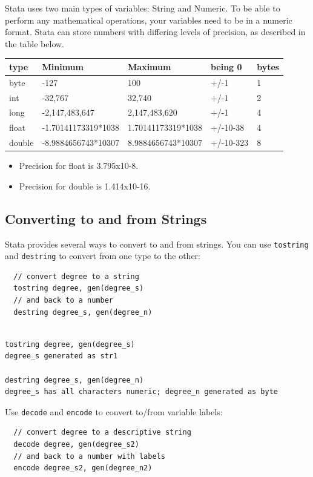 \documentclass[]{book}
\providecommand{\tightlist}{%
  \setlength{\itemsep}{0pt}\setlength{\parskip}{0pt}}
\begin{document}
Stata uses two main types of variables: String and Numeric. To be able
to perform any mathematical operations, your variables need to be in a
numeric format. Stata can store numbers with differing levels of
precision, as described in the table below.

\begin{longtable}[]{@{}lllll@{}}
\toprule
type & Minimum & Maximum & being 0 & bytes\tabularnewline
\midrule
\endhead
byte & -127 & 100 & +/-1 & 1\tabularnewline
int & -32,767 & 32,740 & +/-1 & 2\tabularnewline
long & -2,147,483,647 & 2,147,483,620 & +/-1 & 4\tabularnewline
float & -1.70141173319*1038 & 1.70141173319*1038 & +/-10-38 &
4\tabularnewline
double & -8.9884656743*10307 & 8.9884656743*10307 & +/-10-323 &
8\tabularnewline
\bottomrule
\end{longtable}

\begin{itemize}
\tightlist
\item
  Precision for float is 3.795x10-8.
\item
  Precision for double is 1.414x10-16.
\end{itemize}

\subsection{Converting to and from
Strings}\label{converting-to-and-from-strings}

Stata provides several ways to convert to and from strings. You can use
\texttt{tostring} and \texttt{destring} to convert from one type to the
other:

\begin{verbatim}
  // convert degree to a string
  tostring degree, gen(degree_s)
  // and back to a number
  destring degree_s, gen(degree_n)
\end{verbatim}

\begin{verbatim}

tostring degree, gen(degree_s)
degree_s generated as str1

destring degree_s, gen(degree_n)
degree_s has all characters numeric; degree_n generated as byte
\end{verbatim}

Use \texttt{decode} and \texttt{encode} to convert to/from variable
labels:

\begin{verbatim}
  // convert degree to a descriptive string
  decode degree, gen(degree_s2)
  // and back to a number with labels
  encode degree_s2, gen(degree_n2)
\end{verbatim}
\end{document}
